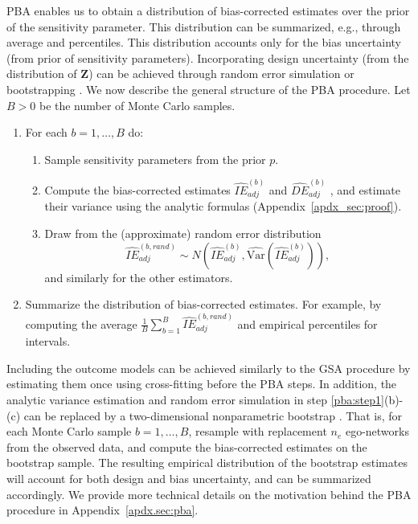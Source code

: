 \documentclass[11pt]{article}
\theoremstyle{definition}
\def \bZ {\boldsymbol{Z}}
\begin{document}
PBA enables us to obtain a distribution of bias-corrected estimates 
over the prior of the sensitivity parameter. 
This distribution can be summarized, e.g., through
average and percentiles.
This distribution accounts only for the bias uncertainty (from prior of sensitivity parameters).
Incorporating design uncertainty (from the distribution of $\bZ$)
 can be achieved through random error simulation or bootstrapping \citep{Greenland2005,Fox2021}.
We now describe the general structure of the PBA procedure.
Let $B > 0$ be the number of Monte Carlo samples.
\begin{enumerate}[label = (\roman*)]
    \item \label{pba:step1} For each $b=1,\ldots,B$ do:
    \begin{enumerate}[label = (\alph*)]
        \item Sample sensitivity parameters from the prior $p$.
        \item Compute the bias-corrected estimates $\widehat{IE}_{adj}^{(b)}$ and $\widehat{DE}_{adj}^{(b)}$
            , and estimate their variance using the analytic formulas (Appendix~\ref{apdx_sec:proof}).
        \item Draw from the (approximate) random error distribution
            \begin{equation*}
                \widehat{IE}_{adj}^{(b,rand)} \sim
                 N\left(\widehat{IE}_{adj}^{(b)},
                  \widehat{\text{Var}}\left(\widehat{IE}_{adj}^{(b)}\right)\right),
            \end{equation*}             
            and similarly for the other estimators.
    \end{enumerate}
    \item Summarize the distribution of bias-corrected estimates. For example,
    by computing the average $\frac{1}{B}\sum_{b=1}^B \widehat{IE}_{adj}^{(b,rand)}$
    and empirical percentiles for intervals.
\end{enumerate}
Including the outcome models can be achieved similarly to the GSA procedure
by estimating them once using cross-fitting before the PBA steps.
In addition, the analytic variance estimation and random error simulation
in step \ref{pba:step1}(b)-(c) can be replaced by a
two-dimensional nonparametric bootstrap \citep{Fox2021}.
That is, for each Monte Carlo sample $b=1,\ldots,B$,
resample with replacement $n_e$ ego-networks from the observed data, and
compute the bias-corrected estimates on the bootstrap sample. 
The resulting empirical distribution of the bootstrap estimates will 
account for both design and bias uncertainty, and can be summarized accordingly.
We provide more technical details on the motivation behind the PBA procedure in Appendix~\ref{apdx.sec:pba}.
\end{document}
